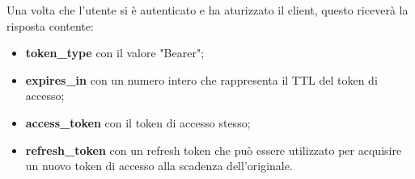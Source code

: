 \noindent Una volta che l'utente si è autenticato e ha aturizzato il client, questo riceverà la risposta contente:
\begin{itemize}
    \item \textbf{token\_type} con il valore "Bearer";
    \item \textbf{expires\_in} con un numero intero che rappresenta il TTL del token di accesso;
    \item \textbf{access\_token} con il token di accesso stesso;
    \item \textbf{refresh\_token} con un refresh token che può essere utilizzato per acquisire un nuovo token di accesso alla scadenza dell'originale.
\end{itemize}



























 